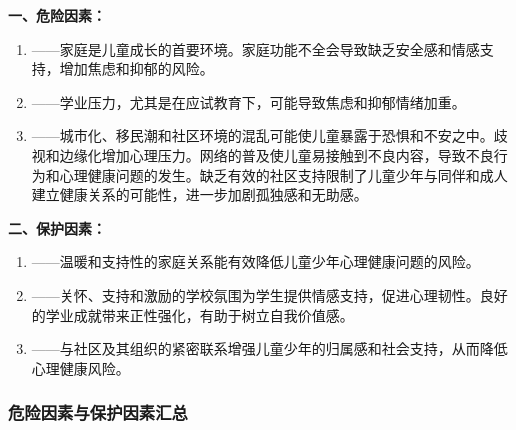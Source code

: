 \begin{defbox}
\textbf{一、危险因素：}

\begin{enumerate}[leftmargin=*]
    \item {}——家庭是儿童成长的首要环境。家庭功能不全会导致缺乏安全感和情感支持，增加焦虑和抑郁的风险。
    \item {}——学业压力，尤其是在应试教育下，可能导致焦虑和抑郁情绪加重。
    \item {}——城市化、移民潮和社区环境的混乱可能使儿童暴露于恐惧和不安之中。歧视和边缘化增加心理压力。网络的普及使儿童易接触到不良内容，导致不良行为和心理健康问题的发生。缺乏有效的社区支持限制了儿童少年与同伴和成人建立健康关系的可能性，进一步加剧孤独感和无助感。
\end{enumerate}

\textbf{二、保护因素：}

\begin{enumerate}[leftmargin=*]
    \item {}——温暖和支持性的家庭关系能有效降低儿童少年心理健康问题的风险。
    \item {}——关怀、支持和激励的学校氛围为学生提供情感支持，促进心理韧性。良好的学业成就带来正性强化，有助于树立自我价值感。
    \item {}——与社区及其组织的紧密联系增强儿童少年的归属感和社会支持，从而降低心理健康风险。
\end{enumerate}
\end{defbox}

\subsubsection{危险因素与保护因素汇总}

